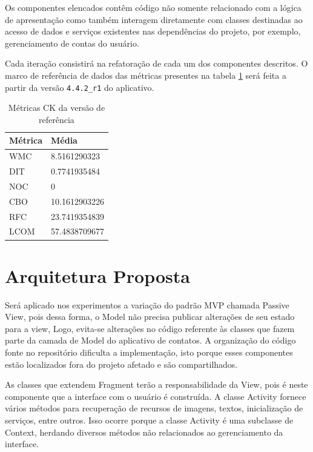 Os componentes elencados contêm código não somente relacionado com a lógica de
apresentação como também interagem diretamente com classes destinadas ao acesso
de dados e serviços existentes nas dependências do projeto, por exemplo,
gerenciamento de contas do usuário. 

Cada iteração consistirá na refatoração de cada um dos componentes
descritos. O marco de referência de dados das métricas presentes na tabela \ref{tab:dados_baseline} será feita a partir da
versão \verb|4.4.2_r1| do aplicativo.

\begin{table}[h]
	\centering
	    \caption{Métricas CK da versão de referência}
	
    \begin{tabular}{ | l | l | }
    \hline
    Métrica &	Média \\ \hline
    WMC  	&	8.5161290323   	\\ \hline
    DIT	 	&	0.7741935484	\\ \hline
	NOC  	& 	0				\\ \hline
	CBO	  	& 	10.1612903226	\\ \hline
	RFC	 	& 	23.7419354839	\\ \hline
	LCOM 	& 	57.4838709677	\\ \hline
    \end{tabular}
    \label{tab:dados_baseline}
\end{table}

\section{Arquitetura Proposta}

Será aplicado nos experimentos a variação do padrão MVP chamada Passive View,
pois dessa forma, o Model não precisa publicar alterações de seu estado para a
view, Logo, evita-se alterações no código referente às classes que fazem
parte da camada de Model do aplicativo de contatos. A organização do código
fonte no repositório dificulta a implementação, isto porque esses componentes estão
localizados fora do projeto afetado e são compartilhados.

As classes que extendem Fragment terão a responsabilidade da View, pois é neste
componente que a interface com o usuário é construída. A classe Activity fornece
vários métodos para recuperação de recursos de imagens, textos, inicialização de
serviços, entre outros. Isso ocorre porque a classe Activity é uma subclasse de Context, herdando diversos métodos não relacionados ao gerenciamento da interface.

